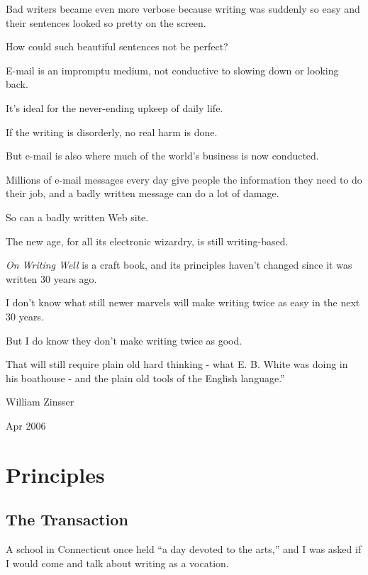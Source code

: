 \documentclass{book}
\numberwithin{equation}{section}
\begin{document}
Bad writers became even more verbose because writing was suddenly so easy and their sentences looked so pretty on the screen.

How could such beautiful sentences not be perfect?

%
E-mail is an impromptu medium, not conductive to slowing down or looking back.

It's ideal for the never-ending upkeep of daily life.

If the writing is disorderly, no real harm is done.

But e-mail is also where much of the world's business is now conducted.

Millions of e-mail messages every day give people the information they need to do their job, and a badly written message can do a lot of damage.

So can a badly written Web site.

The new age, for all its electronic wizardry, is still writing-based.

%
\textit{On Writing Well} is a craft book, and its principles haven't changed since it was written 30 years ago.

I don't know what still newer marvels will make writing twice as easy in the next 30 years.

But I do know they don't make writing twice as good.

That will still require plain old hard thinking - what E. B. White was doing in his boathouse - and the plain old tools of the English language.''

\begin{flushright}
    William Zinsser
    
    Apr 2006
\end{flushright}


\part{Principles}

\chapter{The Transaction}

A school in Connecticut once held ``a day devoted to the arts,'' and I was asked if I would come and talk about writing as a vocation.
\end{document}
